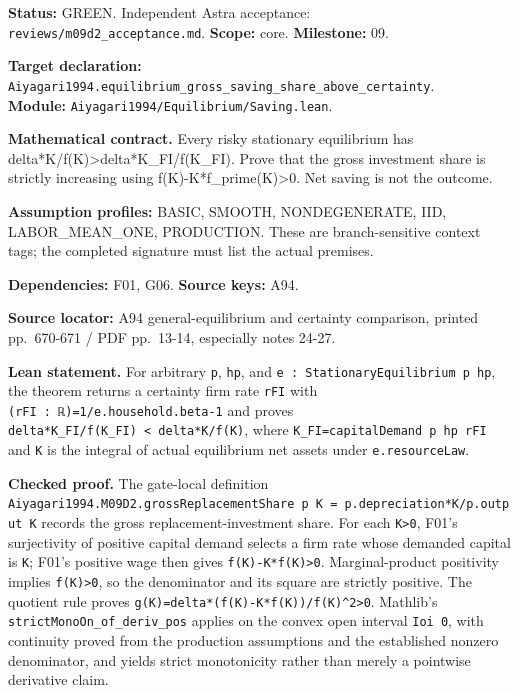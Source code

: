 \documentclass[
  11pt,
]{article}
\let\LedgerOriginalTexttt\texttt
\renewcommand{\texttt}[1]{{\small\LedgerOriginalTexttt{#1}}}
\begin{document}
\textbf{Status:} GREEN. Independent Astra acceptance:
\texttt{reviews/m09d2\_acceptance.md}. \textbf{Scope:} core.
\textbf{Milestone:} 09.

\textbf{Target declaration:}
\texttt{Aiyagari1994.equilibrium\_gross\_saving\_share\_above\_certainty}.\\
\textbf{Module:} \texttt{Aiyagari1994/Equilibrium/Saving.lean}.

\textbf{Mathematical contract.} Every risky stationary equilibrium has
delta*K/f(K)\textgreater delta*K\_FI/f(K\_FI). Prove that the gross
investment share is strictly increasing using
f(K)-K*f\_prime(K)\textgreater0. Net saving is not the outcome.

\textbf{Assumption profiles:} BASIC, SMOOTH, NONDEGENERATE, IID,
LABOR\_MEAN\_ONE, PRODUCTION. These are branch-sensitive context tags;
the completed signature must list the actual premises.

\textbf{Dependencies:} F01, G06. \textbf{Source keys:} A94.

\textbf{Source locator:} A94 general-equilibrium and certainty
comparison, printed pp.~670-671 / PDF pp.~13-14, especially notes 24-27.

\textbf{Lean statement.} For arbitrary \texttt{p}, \texttt{hp}, and
\texttt{e\ :\ StationaryEquilibrium\ p\ hp}, the theorem returns a
certainty firm rate \texttt{rFI} with
\texttt{(rFI\ :\ ℝ)=1/e.household.beta-1} and proves
\texttt{delta*K\_FI/f(K\_FI)\ \textless{}\ delta*K/f(K)}, where
\texttt{K\_FI=capitalDemand\ p\ hp\ rFI} and \texttt{K} is the integral
of actual equilibrium net assets under \texttt{e.resourceLaw}.

\textbf{Checked proof.} The gate-local definition
\texttt{Aiyagari1994.M09D2.grossReplacementShare\ p\ K\ =\ p.depreciation*K/p.output\ K}
records the gross replacement-investment share. For each
\texttt{K\textgreater{}0}, F01's surjectivity of positive capital demand
selects a firm rate whose demanded capital is \texttt{K}; F01's positive
wage then gives \texttt{f(K)-K*f\textquotesingle{}(K)\textgreater{}0}.
Marginal-product positivity implies \texttt{f(K)\textgreater{}0}, so the
denominator and its square are strictly positive. The quotient rule
proves
\texttt{g\textquotesingle{}(K)=delta*(f(K)-K*f\textquotesingle{}(K))/f(K)\^{}2\textgreater{}0}.
Mathlib's \texttt{strictMonoOn\_of\_deriv\_pos} applies on the convex
open interval \texttt{Ioi\ 0}, with continuity proved from the
production assumptions and the established nonzero denominator, and
yields strict monotonicity rather than merely a pointwise derivative
claim.
\end{document}
